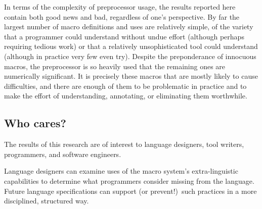 \documentclass[11pt]{article}
\begin{document}
In terms of the complexity of preprocessor usage, the results reported here
contain both good news and bad, regardless of one's perspective.  By far
the largest number of macro definitions and uses are relatively simple, of
the variety that a programmer could understand without undue effort (although
perhaps requiring tedious work) or that a relatively unsophisticated tool
could understand (although in practice very few even try).  Despite the
preponderance of innocuous macros, the preprocessor is so heavily used that
the remaining ones are numerically significant.  It is precisely these
macros that are mostly likely to cause difficulties, and there are enough
of them to be problematic in practice and to make the effort of
understanding, annotating, or eliminating them worthwhile.




%


\subsection{Who cares?}

The results of this research are of interest to language designers, tool
writers, programmers, and software engineers.

Language designers can examine uses of the macro system's extra-linguistic
capabilities to determine what programmers consider missing from the
language.  Future language specifications can support (or prevent!)\ such
practices in a more disciplined, structured way.
\end{document}
